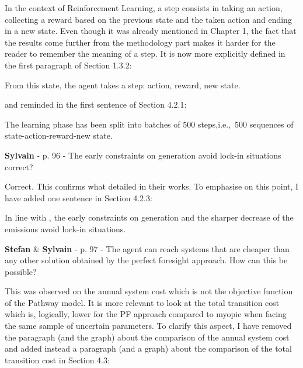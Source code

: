 \documentclass[12pt,a4paper]{article}
\def\ie{i.e.,\ }
\begin{document}
\noindent In the context of Reinforcement Learning, a step consists in taking an action, collecting a reward based on the previous state and the taken action and ending in a new state. Even though it was already mentioned in Chapter 1, the fact that the results come further from the methodology part makes it harder for the reader to remember the meaning of a step. It is now more explicitly defined {\color{blue}in the first paragraph of Section 1.3.2}:

\begin{mdframed}[style=manuscript] %
From this state, the agent takes a step: action, reward, new state.
\end{mdframed}

\noindent and reminded {\color{blue}in the first sentence of Section 4.2.1}:

\begin{mdframed}[style=manuscript] %
The learning phase has been split into batches of 500 steps,\ie 500 sequences of state-action-reward-new state. 
\end{mdframed}

\begin{mdframed}[style=comment] %
{\color{purple} \textbf{Sylvain}} - p. 96 - The early constraints on generation avoid lock-in situations correct?
\end{mdframed}

\noindent Correct. This confirms what \citet{vogt2018starting} detailed in their works. To emphasise on this point, I have added one sentence {\color{blue}in Section 4.2.3}:

\begin{mdframed}[style=manuscript] %
In line with \citet{vogt2018starting}, the early constraints on generation and the sharper decrease of the emissions avoid lock-in situations.
\end{mdframed}

\begin{mdframed}[style=comment] %
{\color{teal} \textbf{Stefan}} \& {\color{purple} \textbf{Sylvain}} - p. 97 - The agent can reach systems that are cheaper than any other solution obtained by the perfect foresight approach. How can this be possible?
\end{mdframed}

\noindent This was observed on the annual system cost which is not the objective function of the Pathway model. It is more relevant to look at the total transition cost which is, logically, lower for the PF approach compared to myopic when facing the same sample of uncertain parameters. To clarify this aspect, I have removed the paragraph (and the graph) about the comparison of the annual system cost and added instead a paragraph (and a graph) about the comparison of the total transition cost {\color{blue}in Section 4.3}:
\end{document}
